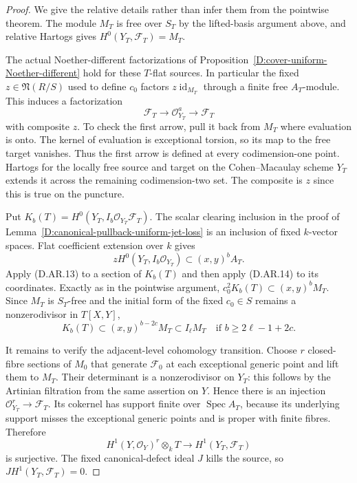 \begin{proof}
We give the relative details rather than infer them from the
pointwise theorem. The module $M_T$ is free over $S_T$ by
the lifted-basis argument above, and relative Hartogs gives
$H^0(Y_T,\mathcal F_T)=M_T$.

The actual Noether-different factorizations of
Proposition~\ref{D:cover-uniform-Noether-different}
hold for these $T$-flat sources. In particular the fixed
$z\in\mathfrak N(R/S)$ used to define $c_0$ factors
$z\operatorname{id}_{M_T}$ through a finite free
$A_T$-module. This induces a factorization
\[
       \mathcal F_T\longrightarrow\mathcal O_{Y_T}^a
                          \longrightarrow\mathcal F_T
                                                        \tag{D.AR.13}
\]
with composite $z$. To check the first arrow, pull it back
from $M_T$ where evaluation is onto. The kernel of evaluation
is exceptional torsion, so its map to the free target
vanishes. Thus the first arrow is defined at every
codimension-one point. Hartogs for the locally free source
and target on the Cohen--Macaulay scheme $Y_T$ extends it
across the remaining codimension-two set. The composite is
$z$ since this is true on the puncture.

Put $K_b(T)=H^0(Y_T,I_b\mathcal O_{Y_T}\mathcal F_T)$.
The scalar clearing inclusion in the proof of
Lemma~\ref{D:canonical-pullback-uniform-jet-loss} is an
inclusion of fixed $k$-vector spaces. Flat coefficient
extension over $k$ gives
\[
 zH^0(Y_T,I_b\mathcal O_{Y_T})
                   \subset (x,y)^bA_T.
                                                        \tag{D.AR.14}
\]
Apply (D.AR.13) to a section of $K_b(T)$ and then apply
(D.AR.14) to its coordinates. Exactly as in the pointwise
argument,
$c_0^2K_b(T)\subset(x,y)^bM_T$.
Since $M_T$ is $S_T$-free and the initial form of the fixed
$c_0\in S$ remains a nonzerodivisor in $T[X,Y]$,
\[
 K_b(T)\subset(x,y)^{b-2c}M_T\subset I_\ell M_T
 \quad\text{if }b\ge2\ell-1+2c.                        \tag{D.AR.15}
\]

It remains to verify the adjacent-level cohomology
transition. Choose $r$ closed-fibre sections of $M_0$
that generate $\mathcal F_0$ at each exceptional generic
point and lift them to $M_T$. Their determinant is a
nonzerodivisor on $Y_T$: this follows by the Artinian
filtration from the same assertion on $Y$. Hence there is
an injection $\mathcal O_{Y_T}^r\to\mathcal F_T$.
Its cokernel has support finite over $\operatorname{Spec}A_T$,
because its underlying support misses the exceptional
generic points and is proper with finite fibres. Therefore
\[
 H^1(Y,\mathcal O_Y)^r\otimes_kT
                       \longrightarrow H^1(Y_T,\mathcal F_T)
\]
is surjective. The fixed canonical-defect ideal $J$ kills
the source, so $JH^1(Y_T,\mathcal F_T)=0$.


\end{proof}
